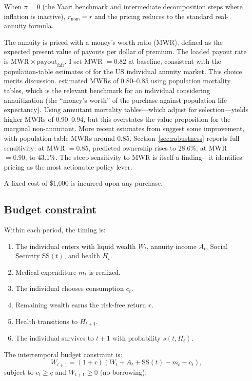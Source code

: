 \documentclass[12pt]{article}
\begin{document}
When $\pi = 0$ (the Yaari benchmark and intermediate decomposition steps where inflation is inactive), $r_{\text{nom}} = r$ and the pricing reduces to the standard real-annuity formula.

The annuity is priced with a money's worth ratio (MWR), defined as the expected present value of payouts per dollar of premium. The loaded payout rate is $\text{MWR} \times \text{payout}_{\text{fair}}$. I set MWR $= 0.82$ at baseline, consistent with the population-table estimates of \citet{mitchell1999} for the US individual annuity market. This choice merits discussion. \citet{mitchell1999} estimated MWRs of 0.80--0.85 using population mortality tables, which is the relevant benchmark for an individual considering annuitization (the ``money's worth'' of the purchase against population life expectancy). Using annuitant mortality tables---which adjust for selection---yields higher MWRs of 0.90--0.94, but this overstates the value proposition for the marginal non-annuitant. More recent estimates from \citet{wettstein2021} suggest some improvement, with population-table MWRs around 0.85. Section~\ref{sec:robustness} reports full sensitivity: at MWR $= 0.85$, predicted ownership rises to 28.6\%; at MWR $= 0.90$, to 43.1\%. The steep sensitivity to MWR is itself a finding---it identifies pricing as the most actionable policy lever.

A fixed cost of \$1,000 is incurred upon any purchase.

\subsection{Budget constraint}

Within each period, the timing is:
\begin{enumerate}
\item The individual enters with liquid wealth $W_t$, annuity income $A_t$, Social Security $\text{SS}(t)$, and health $H_t$.
\item Medical expenditure $m_t$ is realized.
\item The individual chooses consumption $c_t$.
\item Remaining wealth earns the risk-free return $r$.
\item Health transitions to $H_{t+1}$.
\item The individual survives to $t+1$ with probability $s(t, H_t)$.
\end{enumerate}

The intertemporal budget constraint is:
\begin{equation}
\label{eq:budget}
W_{t+1} = (1 + r)(W_t + A_t + \text{SS}(t) - m_t - c_t),
\end{equation}
subject to $c_t \geq \underline{c}$ and $W_{t+1} \geq 0$ (no borrowing).
\end{document}
